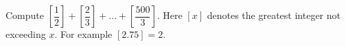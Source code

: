 Compute $\left[\dfrac{1}{2}\right]+\left[\dfrac{2}{3}\right]+\ldots+\left[\dfrac{500}{3}\right]$. Here $[x]$ denotes the greatest integer not exceeding $x$. For example $[2.75]=2$.
